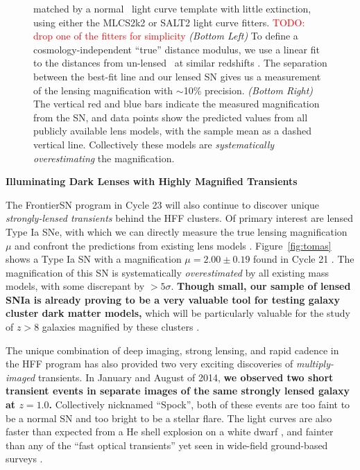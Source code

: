\documentclass[12pt]{article}
\begin{document}
\begin{figure}
{  matched by a normal \SNIa\ light curve template with little
  extinction, using either the MLCS2k2 or SALT2 light curve fitters.
  \textcolor{red}{TODO: drop one of the fitters for simplicity}
  {\it(Bottom Left)} To define a cosmology-independent ``true''
  distance modulus, we use a linear fit to the distances from
  un-lensed \SNe\ at similar redshifts \citep{Riess:2007,
    Suzuki:2012}. The separation between the best-fit line and our
  lensed SN gives us a measurement of the lensing magnification with
  $\sim$10\% precision.  {\it (Bottom Right)} The vertical red and
  blue bars indicate the measured magnification from the SN, and data
  points show the predicted values from all publicly available lens
  models, with the sample mean as a dashed vertical line. Collectively
  these models are {\it systematically overestimating} the
  magnification. }
\end{figure}


\pagebreak
\centerline {\bf Illuminating Dark Lenses with Highly Magnified Transients} 
\medskip

The FrontierSN program in Cycle 23 will also continue to discover
unique {\it strongly-lensed transients} behind the HFF clusters. Of
primary interest are lensed Type Ia SNe, with which we can directly
measure the true lensing magnification $\mu$ and confront the
predictions from existing lens models
\citep{Riehm:2011,Patel:2014,Nordin:2014}.  Figure~\ref{fig:tomas}
shows a Type Ia SN with a magnification
$\mu=2.00\pm0.19$ found in Cycle 21 \citep{Rodney:2015b}.  The
magnification of this SN is systematically {\it overestimated} by all
existing mass models, with some discrepant by $>5\sigma$.
{\bf Though small, our sample of lensed SNIa is already proving to be
  a very valuable tool for testing galaxy cluster dark matter models,}
which will be particularly valuable for the study of $z>8$ galaxies
magnified by these clusters
\citep[e.g.][]{Zheng:2012,Coe:2013,Bouwens:2014,Zitrin:2014}.

The unique combination of deep imaging, strong lensing, and rapid
cadence in the HFF program has also provided two very
exciting discoveries of {\it multiply-imaged} transients.  In January
and August of 2014, {\bf we observed two short transient events in
  separate images of the same strongly lensed galaxy at $z=1.0$.}
Collectively nicknamed ``Spock'', both of these events are too faint
to be a normal SN and too bright to be a stellar flare.  The light
curves are also faster than expected from a He shell explosion on a
white dwarf \citep[a ``.Ia'' event][]{Bildsten:2007,Shen:2010}, and
fainter than any of the ``fast optical transients'' yet seen in
wide-field ground-based surveys
\citep[e.g.][]{Kasliwal:2010,Poznanski:2010,Ofek:2010,Drout:2014,Vinko:2015}.
\end{document}
